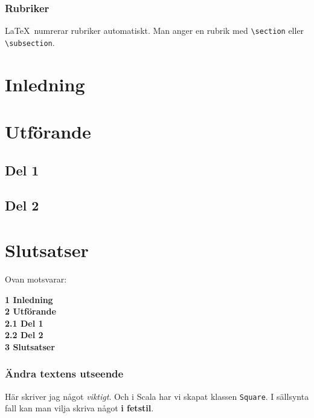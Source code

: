 \begin{frame}[fragile,t]
  \frametitle{Rubriker}
  \vspace{2em}
  \LaTeX\ numrerar rubriker automatiskt. Man anger en rubrik med
  \verb+\section+ eller \verb+\subsection+.

  \blankline
  \begin{exlatex}
\section{Inledning}
\section{Utförande}
\subsection{Del 1}
\subsection{Del 2}
\section{Slutsatser}
  \end{exlatex}

  Ovan motsvarar:

  \begin{exlatex}
{\Large\bfseries 1 Inledning} \\[1ex]
{\Large\bfseries 2 Utförande} \\[1ex]
{\large\bfseries 2.1 Del 1} \\[1ex]
{\large\bfseries 2.2 Del 2} \\[1ex]
{\Large\bfseries 3 Slutsatser}
  \end{exlatex}

\end{frame}

\begin{frame}[fragile,t]
  \frametitle{Ändra textens utseende}
  \vspace{2em}

  \begin{itemize}
  \end{itemize}

  \blankline
  
  \begin{exlatex}
Här skriver jag något \emph{viktigt}.
Och i Scala har vi skapat klassen \texttt{Square}.
I sällsynta fall kan man vilja skriva något \textbf{i fetstil}.
  \end{exlatex}
  
  \blankline
\end{frame}


